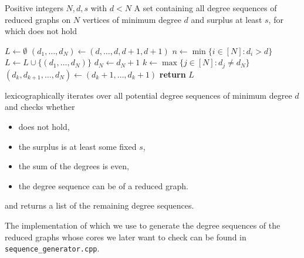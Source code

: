 \documentclass[a4paper,11pt,oneside]{scrartcl}
\theoremstyle{definition}
\theoremstyle{remark}
\begin{document}
\begin{algorithm}[ht]
    \caption{\textsc{GenerateSeqs}$(N, d, s)$}
    \label{algorithm:sequence_generator}
    \begin{algorithmic}[1]
        \REQUIRE Positive integers $N, d, s$ with $d < N$
        \ENSURE A set containing all degree sequences of reduced graphs on $N$ vertices of minimum degree $d$ and surplus at least $s$, for which  does not hold
        
        \STATE $L \gets \emptyset$
        \STATE $(d_1,\dots,d_N)\gets (d,\dots,d,d+1,d+1)$ \label{algorithm_line:sequence_generator_seq_instanciation}
            \STATE $n \gets \min\{i \in [N] : d_i >d\}$
            \label{algorithm_line:sequence_generator_if_inequality_does_not_hold}
                \label{algorithm_line:sequence_generator_if_deg_seq_conditions}
                    \STATE $L \gets L \cup \{(d_1,\dots,d_N)\}$ \label{algorithm_line:sequence_generator_add_seq}
                \ENDIF
                \STATE $d_N \gets d_N + 1$ \label{algorithm_line:sequence_generator_inc_last}
            \ELSE
                \STATE $k \gets \max\{ j \in [N] : d_j \neq d_N\}$
                \STATE $(d_k,d_{k+1}, \dots, d_N) \gets (d_k +1, \dots, d_k + 1)$ \label{algorithm_line:sequence_generator_inc_last_few}
            \ENDIF
        \ENDWHILE
        \STATE \textbf{return} $L$
    \end{algorithmic}
\end{algorithm}

 lexicographically iterates over all potential degree sequences of minimum degree $d$ and checks whether 
\begin{itemize}
    \item {} does not hold,
    \item the surplus is at least some fixed $s$,
    \item the sum of the degrees is even,
    \item the degree sequence can be of a reduced graph.
\end{itemize}
and returns a list of the remaining degree sequences.

The implementation of  which we use to generate the degree sequences of the reduced graphs whose cores we later want to check can be found in \texttt{sequence\_generator.cpp}. 
\end{document}
